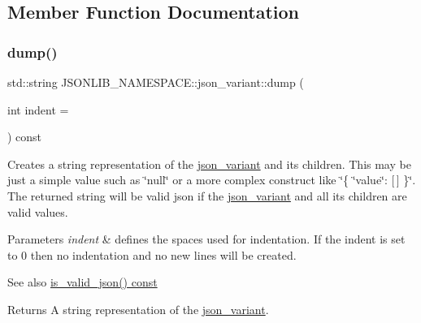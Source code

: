 \subsection{Member Function Documentation}
\mbox{\label{classJSONLIB__NAMESPACE_1_1json__variant_a72d4a39d77b76f076354219edc6ea4a0}} 
\subsubsection{\texorpdfstring{dump()}{dump()}}
{\footnotesize\ttfamily std\+::string J\+S\+O\+N\+L\+I\+B\+\_\+\+N\+A\+M\+E\+S\+P\+A\+C\+E\+::json\+\_\+variant\+::dump (\begin{DoxyParamCaption}\item[{int}]{indent = {} }\end{DoxyParamCaption}) const}



Creates a string representation of the \hyperlink{classJSONLIB__NAMESPACE_1_1json__variant}{json\+\_\+variant} and its children. This may be just a simple value such as \char`\"{}null\char`\"{} or a more complex construct like \char`\"{}\{ \char`\"{}value\char`\"{}\+: \mbox{[}$\,$\mbox{]} \}\char`\"{}. The returned string will be valid json if the \hyperlink{classJSONLIB__NAMESPACE_1_1json__variant}{json\+\_\+variant} and all its children are valid values. 


\begin{DoxyParams}{Parameters}
{\em indent} & defines the spaces used for indentation. If the indent is set to 0 then no indentation and no new lines will be created. \\
\hline
\end{DoxyParams}
\begin{DoxySeeAlso}{See also}
\hyperlink{classJSONLIB__NAMESPACE_1_1json__variant_a158e3148d9256af3d1b8251b2ca7b6c4}{is\+\_\+valid\+\_\+json() const} 
\end{DoxySeeAlso}
\begin{DoxyReturn}{Returns}
A string representation of the \hyperlink{classJSONLIB__NAMESPACE_1_1json__variant}{json\+\_\+variant}. 
\end{DoxyReturn}
\mbox{\label{classJSONLIB__NAMESPACE_1_1json__variant_ae68b9cb156c2b2f9e12c7f889634b63a}} 
